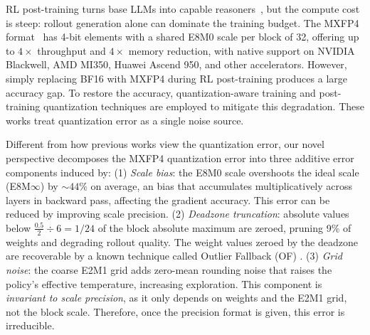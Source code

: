 \documentclass{article}
\theoremstyle{definition}
\theoremstyle{remark}
\newcommand{\be}{\bm{e}}
\newcommand{\norm}[1]{\left\|#1\right\|}
\newcommand{\inner}[2]{\langle #1,\, #2 \rangle}
\begin{document}
RL post-training turns base LLMs into capable reasoners~\citep{shao2024deepseekmath,yu2025dapo}, but the compute cost is steep: rollout generation alone can dominate the training budget. The MXFP4 format~\citep{rouhani2023ocp} has 4-bit elements with a shared E8M0 scale per block of 32, offering up to $4\times$ throughput and $4\times$ memory reduction, with native support on NVIDIA Blackwell, AMD MI350, Huawei Ascend 950, and other accelerators. However, simply replacing BF16 with MXFP4 during RL post-training produces a large accuracy gap. To restore the accuracy, quantization-aware training \cite{liu2024llmqat} and post-training quantization \cite{lin2024awq, frantar2023gptq} techniques are employed to mitigate this degradation. These works treat quantization error as a single noise source.

Different from how previous works view the quantization error, our novel perspective  decomposes the MXFP4 quantization error into three additive error components induced by: 
(1) \textit{Scale bias}: the E8M0 scale overshoots the ideal scale (E8M$\infty$) by ${\sim}44\%$ on average, an bias that accumulates multiplicatively across layers in backward pass, affecting the gradient accuracy. This error can be reduced by improving scale precision.
(2) \textit{Deadzone truncation}: absolute values below $\frac{0.5}{2}\div 6 = 1/24$ of the block absolute maximum are zeroed, pruning 9\% of weights and degrading rollout quality. The weight values zeroed by the deadzone are recoverable by a known technique called Outlier Fallback (OF) \cite{zhang2025fallback}.
(3) \textit{Grid noise}: the coarse E2M1 grid adds zero-mean rounding noise that raises the policy's effective temperature, increasing exploration. This component is \emph{invariant to scale precision}, as it only depends on weights and the E2M1 grid, not the block scale. Therefore, once the precision format is given, this error is irreducible. 


\end{document}
